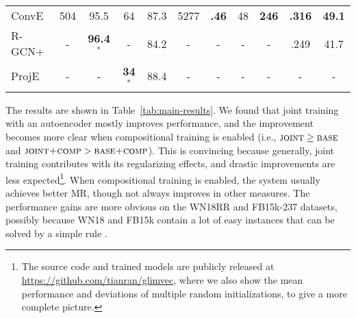\documentclass[11pt,a4paper]{article}
\begin{document}
\begin{table*}[!t]
\begin{tabular}{@{}lcccccccccc@{}}
ConvE \citep{dettmers2018conve} & 504 & 95.5 & 64 & 87.3 & 5277 & \textbf{.46} & 48 & \textbf{246} & \textbf{.316} & \textbf{49.1} \\
R-GCN+ \citep{DBLP:journals/corr/SchlichtkrullKB17} & - & \textbf{96.4}$^*$ & - & 84.2 & - & - & - & - & .249 & 41.7 \\
ProjE \citep{DBLP:conf/aaai/ShiW17} & - & - & \textbf{34$^*$} & 88.4 & - & - & - & - & - & - \\
\bottomrule
\end{tabular}
\caption{%
KBC results on the WN18, FB15k, WN18RR, and FB15k-237 datasets. The first and 
second sectors compare our joint to the base models with and without compositional 
training, respectively; the third sector shows our re-experiments and the fourth 
shows previous published results. Bold numbers are the best in each sector, and $(^*)$ indicates 
the best of all.}
\label{tab:main-results}
\end{table*}

The results are shown in Table~\ref{tab:main-results}. We found that joint 
training with an autoencoder mostly improves performance, and 
the improvement becomes more clear when compositional training 
is enabled (i.e., $\textsc{joint}\geq\textsc{base}$ and $\textsc{joint+comp}>\textsc{base+comp}$). This is convincing because 
generally, joint training contributes with its regularizing effects, 
and drastic improvements are less 
expected\footnote{The source code and trained models are 
publicly released at \url{https://github.com/tianran/glimvec}, 
where we also show the mean performance and deviations of 
multiple random initializations, to give a more 
complete picture.}.
When compositional training is enabled, the system usually 
achieves better MR, though not always improves in other 
measures. The performance gains are more obvious on the 
WN18RR and FB15k-237 datasets, possibly because WN18 and 
FB15k contain a lot of easy instances that can be solved 
by a simple rule \cite{dettmers2018conve}.
\end{document}
